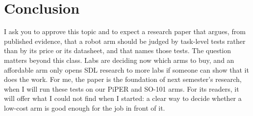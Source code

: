 \section{Conclusion}

I ask you to approve this topic and to expect a research paper that argues, from published
evidence, that a robot arm should be judged by task-level tests rather than by its price or
its datasheet, and that names those tests. The question matters beyond this class. Labs are
deciding now which arms to buy, and an affordable arm only opens SDL research to more labs if
someone can show that it does the work. For me, the paper is the foundation of next
semester's research, when I will run these tests on our PiPER and SO-101 arms. For its
readers, it will offer what I could not find when I started: a clear way to decide whether a
low-cost arm is good enough for the job in front of it.
